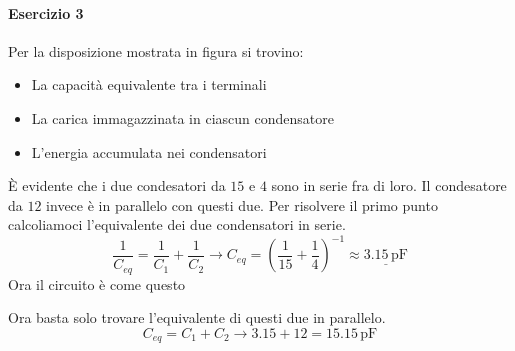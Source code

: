 \paragraph{Esercizio 3}
Per la disposizione mostrata in figura si trovino:
\begin{itemize}[label={$\bullet$}]
  \item La capacità equivalente tra i terminali
  \item La carica immagazzinata in ciascun condensatore
  \item L'energia accumulata nei condensatori
\end{itemize}
\begin{center}
\end{center}
\divisor

È evidente che i due condesatori da $15$ e $4$ sono in serie fra di loro. Il condesatore da $12$ 
invece è in parallelo con questi due. Per risolvere il primo punto calcoliamoci l'equivalente dei
due condensatori in serie.
\begin{equation*}
  \frac{1}{C_{eq}} = \frac{1}{C_1} + \frac{1}{C_2} \rightarrow
  C_{eq} = \left(\frac{1}{15} + \frac{1}{4}\right)^{-1} \approx\underline{3.15\,\text{pF}}
\end{equation*}
Ora il circuito è come questo
\begin{center}
\end{center}
Ora basta solo trovare l'equivalente di questi due in parallelo.
\begin{equation*}
  C_{eq} = C_1 + C_2 \rightarrow 3.15 + 12 = \boxed{15.15\,\text{pF}}
\end{equation*}


